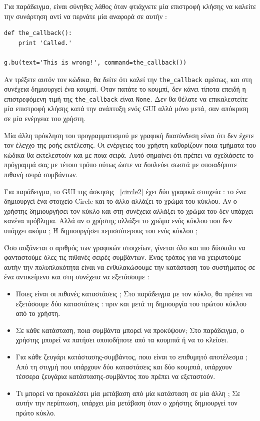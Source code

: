 \documentclass[10pt]{book}
\begin{document}
Για παράδειγμα, είναι σύνηθες λάθος όταν φτιάχνετε μία επιστροφή κλήσης να καλείτε την συνάρτηση αντί να περνάτε μία αναφορά σε αυτήν :

\begin{verbatim}
def the_callback():
    print 'Called.'

g.bu(text='This is wrong!', command=the_callback())
\end{verbatim}
%
 Αν τρέξετε αυτόν τον κώδικα, θα δείτε ότι καλεί την  \verb"the_callback"  αμέσως, 
και στη συνέχεια δημιουργεί ένα κουμπί.  Όταν πατάτε το κουμπί, δεν κάνει τίποτα επειδή η επιστρεφόμενη τιμή της  \verb"the_callback"  είναι  {\tt None}.   
Δεν θα θέλατε να επικαλεστείτε μία επιστροφή κλήσης κατά την ανάπτυξη ενός  GUI  αλλά 
μόνο μετά, σαν απόκριση σε μία ενέργεια του χρήστη.

Μία άλλη πρόκληση του προγραμματισμού με γραφική διασύνδεση είναι ότι δεν έχετε τον έλεγχο 
της ροής εκτέλεσης.  Οι ενέργειες του χρήστη καθορίζουν ποια τμήματα του κώδικα θα εκτελεστούν 
και με ποια σειρά.  Αυτό σημαίνει ότι πρέπει να σχεδιάσετε το πρόγραμμά σας με τέτοιο τρόπο ούτως ώστε να δουλεύει σωστά με οποιαδήποτε πιθανή σειρά συμβάντων.

Για παράδειγμα, το  GUI  της άσκησης~ \ref{circle2}  έχει δύο γραφικά στοιχεία :  το ένα δημιουργεί ένα στοιχείο  Circle  και το άλλο αλλάζει το χρώμα του κύκλου.  Αν ο χρήστης δημιουργήσει τον κύκλο και στη συνέχεια αλλάξει το χρώμα του δεν υπάρχει κανένα πρόβλημα.  Αλλά αν ο χρήστης αλλάξει το χρώμα ενός κύκλου που δεν υπάρχει ακόμα ;   Ή δημιουργήσει περισσότερους του ενός κύκλου ;

 Όσο αυξάνεται ο αριθμός των γραφικών στοιχείων, γίνεται όλο και πιο δύσκολο να φανταστούμε 
όλες τις πιθανές σειρές συμβάντων.  Ένας τρόπος για να χειριστούμε αυτήν την πολυπλοκότητα είναι να ενθυλακώσουμε την κατάσταση του συστήματος σε ένα αντικείμενο και στη συνέχεια να εξετάσουμε :

\begin{itemize}

 
\item Ποιες είναι οι πιθανές καταστάσεις ;   Στο παράδειγμα με τον κύκλο, θα πρέπει 
να εξετάσουμε δύο καταστάσεις :  πριν και μετά τη δημιουργία του πρώτου κύκλου από το 
χρήστη.

\item Σε κάθε κατάσταση, ποια συμβάντα μπορεί να προκύψουν;  Στο παράδειγμα, ο χρήστης 
μπορεί να πατήσει οποιοδήποτε από τα κουμπιά ή να το κλείσει.

\item Για κάθε ζευγάρι κατάστασης-συμβάντος, ποιο είναι το επιθυμητό αποτέλεσμα ;   
Από τη στιγμή που υπάρχουν δύο καταστάσεις και δύο κουμπιά, υπάρχουν τέσσερα ζευγάρια κατάστασης-συμβάντος που πρέπει να εξεταστούν.

\item Τι μπορεί να προκαλέσει μία μετάβαση από μία κατάσταση σε μία άλλη ;   
Σε αυτήν την περίπτωση, υπάρχει μία μετάβαση όταν ο χρήστης δημιουργεί τον πρώτο κύκλο.
 

\end{itemize}
\end{document}
